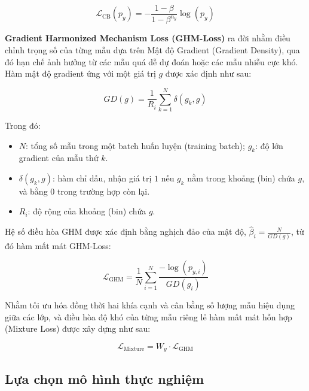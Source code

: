 $$\mathcal{L}_{\text{CB}}(p_y) = -\frac{1 - \beta}{1 - \beta^{n_y}} \log(p_y)$$

\textbf{Gradient Harmonized Mechanism Loss (GHM-Loss)} ra đời nhằm điều chỉnh trọng số của từng mẫu dựa trên Mật độ Gradient (Gradient Density), qua đó hạn chế ảnh hưởng từ các mẫu quá dễ dự đoán hoặc các mẫu nhiễu cực khó. Hàm mật độ gradient ứng với một giá trị $g$ được xác định như sau:

$$GD(g) = \frac{1}{R_{i}} \sum_{k=1}^{N} \delta(g_{k}, g)$$

Trong đó:
\begin{itemize}[label=-]
    \item $N$: tổng số mẫu trong một batch huấn luyện (training batch); $g_{k}$: độ lớn gradient của mẫu thứ $k$.
    \item $\delta(g_{k}, g)$: hàm chỉ dấu, nhận giá trị $1$ nếu $g_{k}$ nằm trong khoảng (bin) chứa $g$, và bằng $0$ trong trường hợp còn lại.
    \item $R_{i}$: độ rộng của khoảng (bin) chứa $g$.
\end{itemize}

Hệ số điều hòa GHM được xác định bằng nghịch đảo của mật độ, $\hat{\beta}_{i}=\frac{N}{GD(g)}$, từ đó hàm mất mát GHM-Loss:

$$\mathcal{L}_{\text{GHM}} = \frac{1}{N} \sum_{i=1}^{N} \frac{-\log(p_{y, i})}{GD(g_{i})}$$

Nhằm tối ưu hóa đồng thời hai khía cạnh và cân bằng số lượng mẫu hiệu dụng giữa các lớp, và điều hòa độ khó của từng mẫu riêng lẻ hàm mất mát hỗn hợp (Mixture Loss) được xây dựng như sau:

$$\mathcal{L}_{\text{Mixture}} = W_y \cdot \mathcal{L}_{\text{GHM}}$$

\subsection{Lựa chọn mô hình thực nghiệm}

